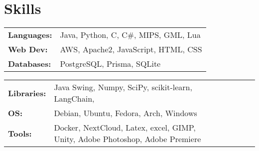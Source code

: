 \documentclass[letterpaper,10pt]{article}
\begin{document}





    \section{Skills}
    \begin{multicols}{2}
            \begin{tabular}{l l}
                \textbf{Languages: } & Java, Python, C, C\#, MIPS, GML, Lua \\
                \textbf{Web Dev: } & AWS, Apache2, JavaScript, HTML, CSS \\%
                \textbf{Databases: } & PostgreSQL, Prisma, SQLite \\
            \end{tabular}
            \begin{tabular}{lp{0.8\linewidth} lp{0.8\linewidth}}
                \textbf{Libraries: } & Java Swing, Numpy, SciPy, scikit-learn, LangChain, \\ %
                \textbf{OS: } & Debian, Ubuntu, Fedora, Arch, Windows\\
                \textbf{Tools: } & Docker, NextCloud, Latex, excel, GIMP, Unity, Adobe Photoshop, Adobe Premiere
            \end{tabular}
    \end{multicols}
\end{document}
